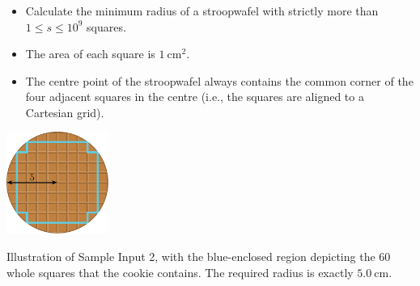 \begin{frame}
    \frametitle{\problemtitle}

    \begin{columns}
        \begin{column}[T]{.70\textwidth}
            \begin{itemize}
                \item Calculate the minimum radius of a stroopwafel with strictly more than $1 \leq s \leq 10^9$ squares.
                \item The area of each square is $1~\text{cm}^2$.
                \item The centre point of the stroopwafel always contains the common
                corner of the four adjacent squares in the centre
                (i.e., the squares are aligned to a Cartesian grid).
            \end{itemize}

            \vspace{1em}

            \centering
            \includegraphics[width=0.25\textwidth]{sample}

            \small
            Illustration of Sample Input 2, with the blue-enclosed region depicting
            the $60$ whole squares that the cookie contains.
            The required radius is exactly $5.0~\text{cm}$.
        \end{column}

    \end{columns}
\end{frame}

